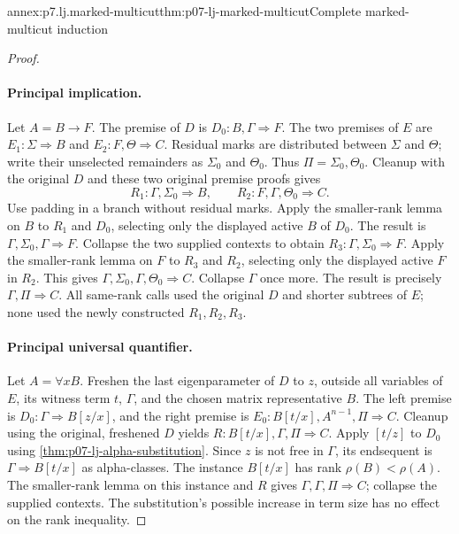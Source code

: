 \begin{annexitem}{annex:p7.lj.marked-multicut}{thm:p07-lj-marked-multicut}{Complete marked-multicut induction}
\begin{proof}
\paragraph{Principal implication.}
Let \(A=B\to F\).  The premise of \(D\) is
\(D_0:B,\Gamma\Rightarrow F\).  The two premises of \(E\)
are \(E_1:\Sigma\Rightarrow B\) and
\(E_2:F,\Theta\Rightarrow C\).  Residual marks are distributed
between \(\Sigma\) and \(\Theta\); write their unselected
remainders as \(\Sigma_0\) and \(\Theta_0\).  Thus
\(\Pi=\Sigma_0,\Theta_0\).  Cleanup with the original \(D\)
and these two original premise proofs gives
\[
 R_1:\Gamma,\Sigma_0\Rightarrow B,
 \qquad R_2:F,\Gamma,\Theta_0\Rightarrow C.
\]
Use padding in a branch without residual marks.  Apply the smaller-rank
lemma on \(B\) to \(R_1\) and \(D_0\), selecting only the
displayed active \(B\) of \(D_0\).  The result is
\(\Gamma,\Sigma_0,\Gamma\Rightarrow F\).  Collapse the two
supplied contexts to obtain \(R_3:\Gamma,\Sigma_0\Rightarrow F\).
Apply the smaller-rank lemma on \(F\) to \(R_3\) and \(R_2\),
selecting only the displayed active \(F\) in \(R_2\).  This gives
\(\Gamma,\Sigma_0,\Gamma,\Theta_0\Rightarrow C\).
Collapse \(\Gamma\) once more.  The result is precisely
\(\Gamma,\Pi\Rightarrow C\).
All same-rank calls used the original \(D\) and shorter subtrees of
\(E\); none used the newly constructed \(R_1,R_2,R_3\).

\paragraph{Principal universal quantifier.}
Let \(A=\forall xB\).  Freshen the last eigenparameter of \(D\)
to \(z\), outside all variables of \(E\), its witness term
\(t\), \(\Gamma\), and the chosen matrix representative \(B\).
The left premise is \(D_0:\Gamma\Rightarrow B[z/x]\), and
the right premise is \(E_0:B[t/x],A^{n-1},\Pi\Rightarrow C\).
Cleanup using the original, freshened \(D\) yields
\(R:B[t/x],\Gamma,\Pi\Rightarrow C\).
Apply \([t/z]\) to \(D_0\) using
\ref{thm:p07-lj-alpha-substitution}.  Since \(z\) is not free in
\(\Gamma\), its endsequent is
\(\Gamma\Rightarrow B[t/x]\) as alpha-classes.
The instance \(B[t/x]\) has rank \(\rho(B)<\rho(A)\).
The smaller-rank lemma on this instance and \(R\) gives
\(\Gamma,\Gamma,\Pi\Rightarrow C\); collapse the supplied
contexts.  The substitution's possible increase in term size has no
effect on the rank inequality.


\end{proof}
\end{annexitem}
